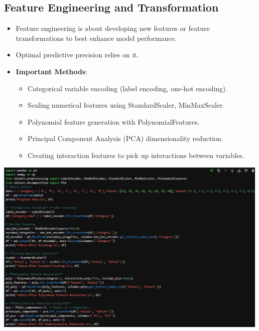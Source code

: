 \documentclass{article}
\begin{document}
\subsection{Feature Engineering and Transformation}  
\begin{itemize}
    \item Feature engineering is about developing new features or feature transformations to best enhance model performance.
    \item Optimal predictive precision relies on it.
\item \textbf{Important Methods}:
    \begin{itemize}
    \item Categorical variable encoding (label encoding, one-hot encoding).
    \item Scaling numerical features using StandardScaler, MinMaxScaler.
    \item Polynomial feature generation with PolynomialFeatures.
    \item Principal Component Analysis (PCA) dimensionality reduction.
    \item Creating interaction features to pick up interactions between variables.
    \end{itemize}
\end{itemize}

\includegraphics[width=17cm,height=14
cm]{FeatureEngineering.jpeg}
\end{document}

